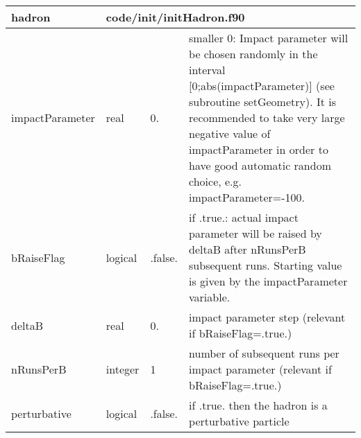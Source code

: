 \documentclass{article}
\begin{document}
\begin{longtable}{llll}
\toprule
\textbf{\large{hadron}} & \multicolumn{3}{l}{\footnotesize{code/init/initHadron.f90}}\\*
\midrule
\endfirsthead
\midrule
\endhead
impactParameter & \begin{minipage}[t]{2cm}real\end{minipage} & \begin{minipage}[t]{2cm}0.\end{minipage} & \begin{minipage}[t]{12cm}smaller 0: Impact parameter will be chosen randomly in the interval [0;abs(impactParameter)] (see subroutine setGeometry). It is recommended to take very large negative value of impactParameter in order to have good automatic random choice, e.g. impactParameter=-100.\end{minipage}\\*
\midrule
bRaiseFlag & \begin{minipage}[t]{2cm}logical\end{minipage} & \begin{minipage}[t]{2cm}.false.\end{minipage} & \begin{minipage}[t]{12cm}if .true.: actual impact parameter will be raised by deltaB after nRunsPerB subsequent runs. Starting value is given by the impactParameter variable.\end{minipage}\\*
\midrule
deltaB & \begin{minipage}[t]{2cm}real\end{minipage} & \begin{minipage}[t]{2cm}0.\end{minipage} & \begin{minipage}[t]{12cm}impact parameter step (relevant if bRaiseFlag=.true.)\end{minipage}\\*
\midrule
nRunsPerB & \begin{minipage}[t]{2cm}integer\end{minipage} & \begin{minipage}[t]{2cm}1\end{minipage} & \begin{minipage}[t]{12cm}number of subsequent runs per impact parameter (relevant if bRaiseFlag=.true.)\end{minipage}\\*
\midrule
perturbative & \begin{minipage}[t]{2cm}logical\end{minipage} & \begin{minipage}[t]{2cm}.false.\end{minipage} & \begin{minipage}[t]{12cm}if .true. then the hadron is a perturbative particle\end{minipage}\\*

\end{longtable}
\end{document}
